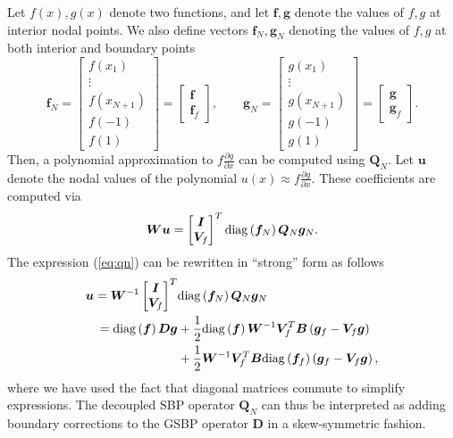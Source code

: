 \documentclass[review,onefignum,onetabnum,final]{siamart171218}
\newcommand{\pd}[2]{\frac{\partial#1}{\partial#2}}
\newcommand{\LRp}[1]{\left( #1 \right)}
\newcommand{\diag}[1]{{\rm diag}\LRp{#1}}
\begin{document}
Let $f(x), g(x)$ denote two functions, and let $\bm{f}, \bm{g}$ denote the values of $f,g$ at interior nodal points.  We also define vectors $\bm{f}_N, \bm{g}_N$ denoting the values of $f,g$ at both interior and boundary points 
\begin{equation}
\bm{f}_N = \begin{bmatrix}
f\LRp{x_1}\\
\vdots\\
f\LRp{x_{N+1}}\\
f(-1)\\
f(1)
\end{bmatrix} = \begin{bmatrix}
\bm{f} \\
\bm{f}_f
\end{bmatrix}, \qquad
\bm{g}_N = \begin{bmatrix}
g\LRp{x_1}\\
\vdots\\
g\LRp{x_{N+1}}\\
g(-1)\\
g(1)
\end{bmatrix} = \begin{bmatrix}
\bm{g} \\
\bm{g}_f
\end{bmatrix}.
\label{eq:fg}
\end{equation}
Then, a polynomial approximation to $f\pd{g}{x}$ can be computed using $\bm{Q}_N$.  Let $\bm{u}$ denote the nodal values of the polynomial $u(x) \approx f\pd{g}{x}$.  These coefficients are computed via
\begin{equation}
\bm{W}\bm{u} = \begin{bmatrix}
\bm{I}\\
\bm{V}_f
\end{bmatrix}^T \diag{\bm{f}_N} \bm{Q}_N \bm{g}_N.
\label{eq:qn}
\end{equation}
The expression (\ref{eq:qn}) can be rewritten in ``strong'' form as follows
\begin{align*}
\bm{u} = \bm{W}^{-1}\begin{bmatrix}
\bm{I}\\
\bm{V}_f
\end{bmatrix}^T& \diag{\bm{f}_N} \bm{Q}_N \bm{g}_N \\
= \diag{\bm{f}}\bm{D}\bm{g} &+ \frac{1}{2}\diag{\bm{f}} \bm{W}^{-1} \bm{V}_f^T \bm{B}\LRp{\bm{g}_f - \bm{V}_f\bm{g}} \\
&+ \frac{1}{2}\bm{W}^{-1} \bm{V}_f^T\bm{B}\diag{\bm{f}_f} \LRp{\bm{g}_f - \bm{V}_f\bm{g}},
\end{align*}
where we have used the fact that diagonal matrices commute to simplify expressions.  The decoupled SBP operator $\bm{Q}_N$ can thus be interpreted as adding boundary corrections to the GSBP operator $\bm{D}$ in a skew-symmetric fashion.  
\end{document}

